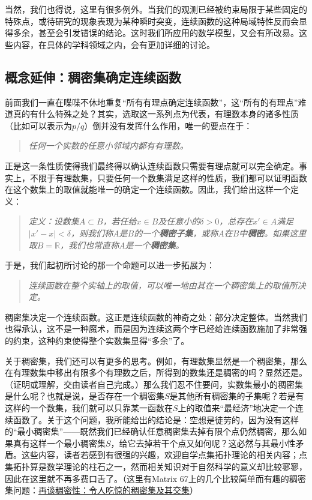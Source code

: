 \documentclass[12pt,a4paper]{article}
\begin{document}
{{			当然，我们也得说，这里有很多例外。当我们的观测已经被约束局限于某些固定的特殊点，或待研究的现象表现为某种瞬时突变，连续函数的这种局域特性反而会显得多余，甚至会引发错误的结论。这时我们所应用的数学模型，又会有所改易。这些内容，在具体的学科领域之内，会有更加详细的讨论。
		}
	
		\subsection{概念延伸：稠密集确定连续函数}{
			前面我们一直在喋喋不休地重复“所有有理点确定连续函数”，这“所有的有理点”难道真的有什么特殊之处？其实，选取这一系列点为代表，有理数本身的诸多性质（比如可以表示为$p/q$）倒并没有发挥什么作用，唯一的要点在于：
			\begin{quote}\itshape
				任何一个实数的任意小邻域内都有有理数。
			\end{quote}
			正是这一条性质使得我们最终得以确认连续函数只需要有理点就可以完全确定。事实上，不限于有理数集，只要任何一个数集满足这样的性质，我们都可以证明函数在这个数集上的取值就能唯一的确定一个连续函数。因此，我们给出这样一个定义：
			\begin{quote}\itshape
				定义：设数集$A\subset B$，若任给$x\in B$及任意小的$\delta>0$，总存在$x'\in A$满足$\mid x'-x\mid<\delta$，则我们称$A$是$B$的一个{\bfseries 稠密子集}，或称$A$在$B$中{\bfseries 稠密}。如果这里取$B=\mathbb{R}$，我们也常直称$A$是一个{\bfseries 稠密集}。
			\end{quote}
			于是，我们起初所讨论的那一个命题可以进一步拓展为：
			\begin{quote}\itshape
				连续函数在整个实轴上的取值，可以唯一地由其在一个稠密集上的取值所决定。
			\end{quote}
			稠密集决定一个连续函数。这正是连续函数的神奇之处：部分决定整体。当然我们也得承认，这不是一种魔术，而是因为连续这两个字已经给连续函数施加了非常强的约束，这种约束使得整个实数集显得“多余”了。
			
			关于稠密集，我们还可以有更多的思考。例如，有理数集显然是一个稠密集，那么在有理数集中移出有限多个有理数之后，所得到的数集还是稠密的吗？显然还是。（证明或理解，交由读者自己完成。）那么我们忍不住要问，实数集最小的稠密集是什么呢？也就是说，是否存在一个稠密集$S$是其他所有稠密集的子集呢？若是有这样的一个数集，我们就可以只靠某一函数在$S$上的取值来“最经济”地决定一个连续函数了。关于这个问题，我所能给出的结论是：空想是徒劳的，因为没有这样的“最小稠密集”——既然我们已经确认任意稠密集去掉有限个点仍然稠密，那么如果真有这样一个最小稠密集$S$，给它去掉若干个点又如何呢？这必然与其最小性矛盾。这些内容，读者若感到有很强的兴趣，欢迎自学点集拓扑理论的相关内容；点集拓扑算是数学理论的柱石之一，然而相关知识对于自然科学的意义却比较寥寥，因此在这里就不再多费口舌了。（这里有Matrix 67上的几个比较简单而有趣的稠密集问题：\href{http://www.matrix67.com/blog/archives/1480}{\underline {再谈稠密性：令人吃惊的稠密集及其交集}}）
			
		}
	}
	\newpage
\end{document}
